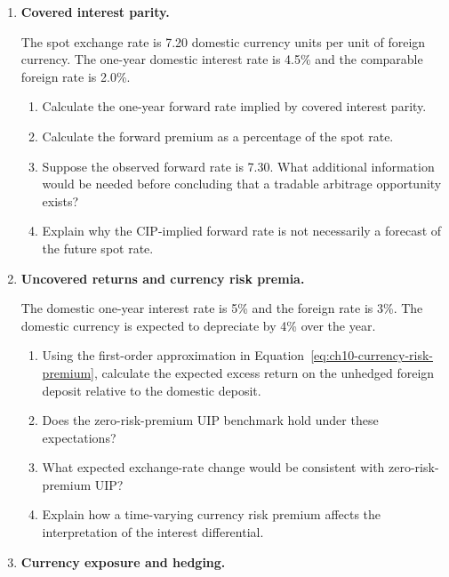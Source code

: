 \begin{enumerate}
\item \textbf{Covered interest parity.}

The spot exchange rate is 7.20 domestic currency units per unit of foreign currency. The one-year domestic interest rate is 4.5\% and the comparable foreign rate is 2.0\%.

\begin{enumerate}

\item Calculate the one-year forward rate implied by covered interest parity.

\item Calculate the forward premium as a percentage of the spot rate.

\item Suppose the observed forward rate is 7.30. What additional information would be needed before concluding that a tradable arbitrage opportunity exists?

\item Explain why the CIP-implied forward rate is not necessarily a forecast of the future spot rate.

\end{enumerate}

\item \textbf{Uncovered returns and currency risk premia.}

The domestic one-year interest rate is 5\% and the foreign rate is 3\%. The domestic currency is expected to depreciate by 4\% over the year.

\begin{enumerate}

\item Using the first-order approximation in Equation~\ref{eq:ch10-currency-risk-premium}, calculate the expected excess return on the unhedged foreign deposit relative to the domestic deposit.

\item Does the zero-risk-premium UIP benchmark hold under these expectations?

\item What expected exchange-rate change would be consistent with zero-risk-premium UIP?

\item Explain how a time-varying currency risk premium affects the interpretation of the interest differential.

\end{enumerate}

\item \textbf{Currency exposure and hedging.}


\end{enumerate}

